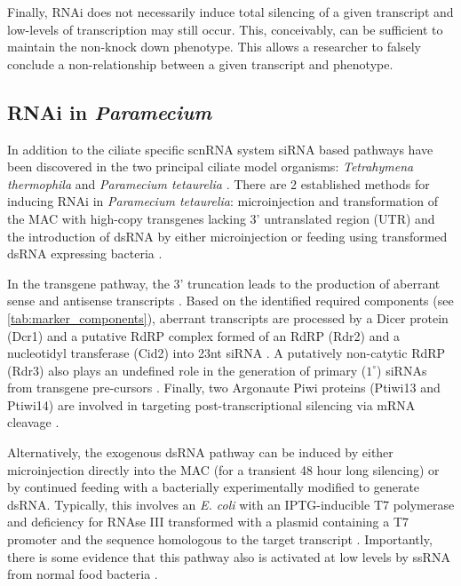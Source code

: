 Finally, RNAi does not necessarily induce total silencing
of a given transcript and low-levels of transcription may still occur.
This, conceivably, can be sufficient to maintain the non-knock down phenotype.
This allows a researcher to falsely conclude a non-relationship between
a given transcript and phenotype.

\subsection{RNAi in \textit{Paramecium}}

In addition to the ciliate specific scnRNA system 
siRNA based pathways have been discovered in the two principal
ciliate model organisms: \textit{Tetrahymena thermophila} \citep{Collins2006,Yao2005}
and \textit{Paramecium tetaurelia} \citep{Galvani2001,Galvani2002}. 
There are 2 established methods for inducing RNAi in \textit{Paramecium tetaurelia}:
microinjection and transformation of the MAC with high-copy transgenes lacking 3' untranslated
region (UTR) \citep{Galvani2001} and the introduction of dsRNA by either
microinjection or feeding using transformed dsRNA expressing bacteria 
\citep{Galvani2002}.

In the transgene pathway, the 3' truncation leads to the production of aberrant
sense and antisense transcripts \citep{Galvani2001,Marker2010,Beisson2010b}.
Based on the identified required components (see \cref{tab:marker_components}), 
aberrant transcripts
are processed by a Dicer protein (Dcr1) \citep{Lepere2009} and
a putative RdRP complex formed of an RdRP (Rdr2) and a nucleotidyl
transferase (Cid2) \citep{Marker2014} into 23nt siRNA \citep{Lepere2009}. 
A putatively non-catytic 
RdRP (Rdr3) also plays an undefined role in the generation
of primary (\(1^{\circ}\)) siRNAs from transgene pre-cursors \citep{Marker2010,Marker2014}.
Finally, two Argonaute Piwi proteins (Ptiwi13 and Ptiwi14) \citep{Bouhouche2011} 
are involved in targeting post-transcriptional silencing via mRNA
cleavage \citep{Bouhouche2011,Marker2014}.


Alternatively, the exogenous dsRNA pathway can be induced by either microinjection directly
into the MAC (for a transient 48 hour long silencing) or by continued feeding
with a bacterially experimentally modified to generate dsRNA.
Typically, this involves an \textit{E. coli} 
with an IPTG-inducible T7 polymerase and 
deficiency for RNAse III transformed with
a plasmid containing a T7 promoter and the sequence
homologous to the target transcript
\citep{Fire1998,Timmons2001,Galvani2002}.
Importantly, there is some evidence that this pathway also is activated at low
levels by ssRNA from normal food bacteria \citep{Carradec2015}.

